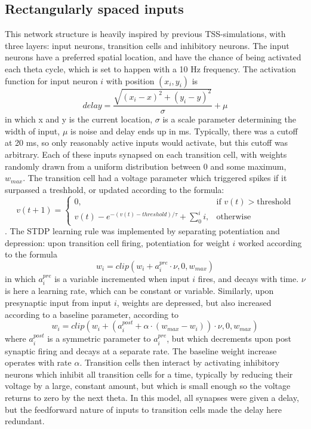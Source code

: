 \documentclass{article}
\begin{document}
    \subsection{Rectangularly spaced inputs} This network structure is heavily inspired by previous TSS-simulations, with three layers: input neurons, transition cells and inhibitory neurons. The input neurons have a preferred spatial location, and have the chance of being activated each theta cycle, which is set to happen with a 10 Hz frequency. The activation function for input neuron \(i\) with position \((x_i, y_i)\) is \begin{equation} \label{key1} delay = \frac{\sqrt{(x_i - x)^2 + (y_i - y)^2}}{\sigma} + \mu\end{equation}
    in which x and y is the current location, \(\sigma\) is a scale parameter determining the width of input, \(\mu\) is noise and delay ends up in ms. Typically, there was a cutoff at 20 ms, so only reasonably active inputs would activate, but this cutoff was arbitrary. Each of these inputs synapsed on each transition cell, with weights randomly drawn from a uniform distribution between 0 and some maximum, \(w_{max}\). The transition cell had a voltage parameter which triggered spikes if it surpassed a treshhold, or updated according to the formula: \[ v(t+1) =  \begin{cases} 0, & \text{if } v(t) > \text{threshold}\\ v(t) - e^{-(v(t) - threshold) / \tau} + \sum_{0}^{i} i, & \text{otherwise}  
    \end{cases}
        \].
    The STDP learning rule was implemented by separating potentiation and depression: upon transition cell firing, potentiation for weight \(i\) worked according to the formula \begin{equation} \label{key3} w_i = clip(w_i + a^{pre}_i \cdot \nu, 0, w_{max})\end{equation} in which \(a^{pre}_i\) is a variable incremented when input \(i\) fires, and decays with time. \(\nu\) is here a learning rate, which can be constant or variable. 
    Similarly, upon presynaptic input from input \(i\), weights are depressed, but also increased according to a baseline parameter, according to \begin{equation} \label{key4} w_i = clip(w_i + (a^{post}_i + \alpha \cdot (w_{max}-w_i)) \cdot \nu, 0, w_{max})\end{equation} where \(a^{post}_i\) is a symmetric parameter to \(a^{pre}_i\), but which decrements upon post synaptic firing and decays at a separate rate. The baseline weight increase operates with rate \(\alpha\).
    Transition cells then interact by activating inhibitory neurons which inhibit all transition cells for a time, typically by reducing their voltage by a large, constant amount, but which is small enough so the voltage returns to zero by the next theta.
    In this model, all synapses were given a delay, but the feedforward nature of inputs to transition cells made the delay here redundant.
\end{document}

